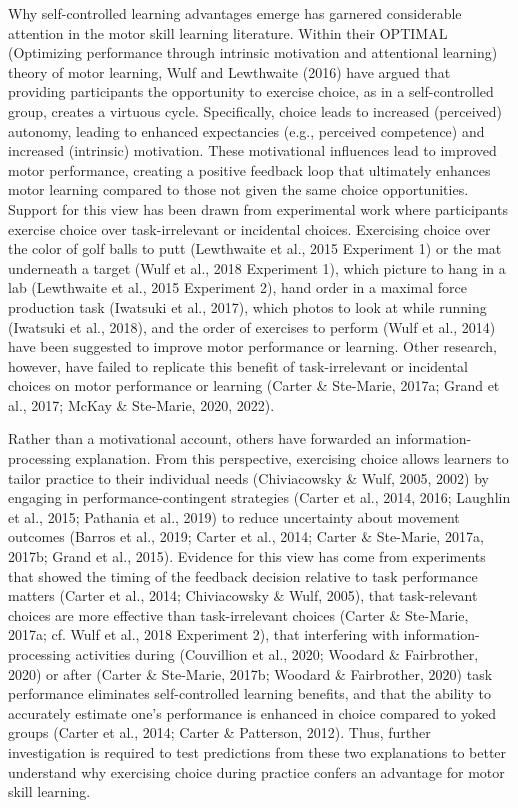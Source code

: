 \documentclass[
  doc, donotrepeattitle,floatsintext]{apa7}
\begin{document}
Why self-controlled learning advantages emerge has garnered considerable attention in the motor skill learning literature. Within their OPTIMAL (Optimizing performance through intrinsic motivation and attentional learning) theory of motor learning, Wulf and Lewthwaite (2016) have argued that providing participants the opportunity to exercise choice, as in a self-controlled group, creates a virtuous cycle. Specifically, choice leads to increased (perceived) autonomy, leading to enhanced expectancies (e.g., perceived competence) and increased (intrinsic) motivation. These motivational influences lead to improved motor performance, creating a positive feedback loop that ultimately enhances motor learning compared to those not given the same choice opportunities. Support for this view has been drawn from experimental work where participants exercise choice over task-irrelevant or incidental choices. Exercising choice over the color of golf balls to putt (Lewthwaite et al., 2015 Experiment 1) or the mat underneath a target (Wulf et al., 2018 Experiment 1), which picture to hang in a lab (Lewthwaite et al., 2015 Experiment 2), hand order in a maximal force production task (Iwatsuki et al., 2017), which photos to look at while running (Iwatsuki et al., 2018), and the order of exercises to perform (Wulf et al., 2014) have been suggested to improve motor performance or learning. Other research, however, have failed to replicate this benefit of task-irrelevant or incidental choices on motor performance or learning (Carter \& Ste-Marie, 2017a; Grand et al., 2017; McKay \& Ste-Marie, 2020, 2022).

Rather than a motivational account, others have forwarded an information-processing explanation. From this perspective, exercising choice allows learners to tailor practice to their individual needs (Chiviacowsky \& Wulf, 2005, 2002) by engaging in performance-contingent strategies (Carter et al., 2014, 2016; Laughlin et al., 2015; Pathania et al., 2019) to reduce uncertainty about movement outcomes (Barros et al., 2019; Carter et al., 2014; Carter \& Ste-Marie, 2017a, 2017b; Grand et al., 2015). Evidence for this view has come from experiments that showed the timing of the feedback decision relative to task performance matters (Carter et al., 2014; Chiviacowsky \& Wulf, 2005), that task-relevant choices are more effective than task-irrelevant choices (Carter \& Ste-Marie, 2017a; cf. Wulf et al., 2018 Experiment 2), that interfering with information-processing activities during (Couvillion et al., 2020; Woodard \& Fairbrother, 2020) or after (Carter \& Ste-Marie, 2017b; Woodard \& Fairbrother, 2020) task performance eliminates self-controlled learning benefits, and that the ability to accurately estimate one's performance is enhanced in choice compared to yoked groups (Carter et al., 2014; Carter \& Patterson, 2012). Thus, further investigation is required to test predictions from these two explanations to better understand why exercising choice during practice confers an advantage for motor skill learning.
\end{document}
